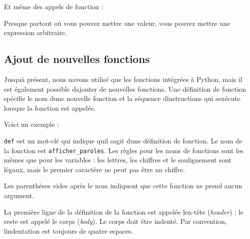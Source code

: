 Et même des appels de fonction :

\begin{Shaded}
\begin{Highlighting}[]
\OperatorTok{=}\OperatorTok{+}\NormalTok{))}
\end{Highlighting}
\end{Shaded}

Presque partout où vous pouvez mettre une valeur, vous pouvez mettre une
expression arbitraire.

\hypertarget{ajout-de-nouvelles-fonctions}{%
\subsection{Ajout de nouvelles
fonctions}\label{ajout-de-nouvelles-fonctions}}

Jusqu\textquotesingle à présent, nous n\textquotesingle avons utilisé
que les fonctions intégrées à Python, mais il est également possible
d\textquotesingle ajouter de nouvelles fonctions. Une définition de
fonction spécifie le nom d\textquotesingle une nouvelle fonction et la
séquence d\textquotesingle instructions qui s\textquotesingle exécute
lorsque la fonction est appelée.

Voici un exemple :

\begin{Shaded}
\begin{Highlighting}[]
    \NormalTok{(}\NormalTok{)}
    \NormalTok{(}\NormalTok{)}
\end{Highlighting}
\end{Shaded}

\texttt{def} est un mot-clé qui indique qu\textquotesingle il
s\textquotesingle agit d\textquotesingle une définition de fonction. Le
nom de la fonction est \texttt{afficher\_paroles}. Les règles pour les
noms de fonctions sont les mêmes que pour les variables : les lettres,
les chiffres et le soulignement sont légaux, mais le premier caractère
ne peut pas être un chiffre.

Les parenthèses vides après le nom indiquent que cette fonction ne prend
aucun argument.

La première ligne de la définition de la fonction est appelée
l\textquotesingle en-tête (\emph{header}) ; le reste est appelé le corps
(\emph{body}). Le corps doit être indenté. Par convention,
l\textquotesingle indentation est toujours de quatre espaces.

